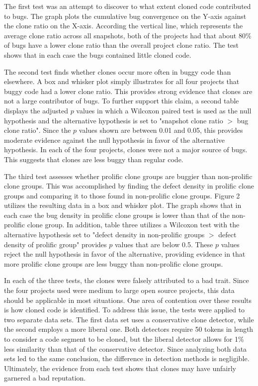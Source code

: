 \documentclass{article}
\begin{document}
The first test was an attempt to discover to what extent cloned code contributed to bugs.
The graph plots the cumulative bug convergence on the Y-axis against the clone ratio on the
X-axis. According the vertical line, which represents the average clone ratio across all
snapshots, both of the projects had that about 80\% of bugs have a lower clone ratio than
the overall project clone ratio. The test shows that in each case the bugs contained little
cloned code.

The second test finds whether clones occur more often in buggy code than elsewhere. A box
and whisker plot simply illustrates for all four projects that buggy code had a lower clone
ratio. This provides strong evidence that clones are not a large contributor of bugs. To
further support this claim, a second table displays the adjusted $p$ values in which a Wilcoxon
paired test is used as the null hypothesis and the alternative hypothesis is set to "snapshot
clone ratio $>$ bug clone ratio". Since the $p$ values shown are between 0.01 and 0.05, this
provides moderate evidence against the null hypothesis in favor of the alternative hypothesis.
In each of the four projects, clones were not a major source of bugs. This suggests that clones
are less buggy than regular code.

The third test assesses whether prolific clone groups are buggier than non-prolific clone groups.
This was accomplished by finding the defect density in prolific clone groups and comparing it to
those found in non-prolific clone groups. Figure 2 utilizes the resulting data in a box and whisker
plot. The graph shows that in each case the bug density in prolific clone groups is lower than that
of the non-prolific clone group. In addition, table three utilizes a Wilcoxon test with the alternative
hypothesis set to "defect density in non-prolific groups $>$ defect density of prolific group" provides
$p$ values that are below 0.5. These $p$ values reject the null hypothesis in favor of the alternative,
providing evidence in that more prolific clone groups are less buggy than non-prolific clone groups.

In each of the three tests, the clones were falsely attributed to a bad trait. Since the four
projects used were medium to large open source projects, this data should be applicable
in most situations. One area of contention over these results is how cloned code is identified.
To address this issue, the tests were applied to two separate data sets. The first data set
uses a conservative clone detector, while the second employs a more liberal one. Both detectors
require 50 tokens in length to consider a code segment to be cloned, but the liberal detector
allows for 1\% less similarity than that of the conservative detector. Since analyzing both
data sets led to the same conclusion, the difference in detection methods is negligible. Ultimately,
the evidence from each test shows that clones may have unfairly garnered a bad reputation.
\end{document}
